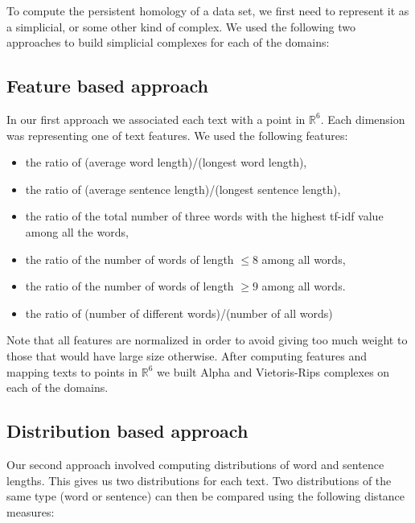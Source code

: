 \documentclass[12pt,a4paper]{amsart}
\def\R{\mathbb R}
\begin{document}
To compute the persistent homology of a data set, we first need to represent it
as a simplicial, or some other kind of complex. We used the following two
approaches to build simplicial complexes for each of the domains:

\subsection{Feature based approach}

In our first approach we associated each text with a point in $\R ^6$. Each
dimension was representing one of text features. We used the following features:
\begin{itemize}
  \setlength\itemsep{0.5em}
  \item the ratio of (average word length)/(longest word length),
  \item the ratio of (average sentence length)/(longest sentence length),
  \item the ratio of the total number of three words with the highest tf-idf
    value among all the words,
  \item the ratio of the number of words of length $\le 8$ among all words,
  \item the ratio of the number of words of length $\ge 9$ among all words.
  \item the ratio of (number of different words)/(number of all words)
\end{itemize}

Note that all features are normalized in order to avoid giving too much weight
to those that would have large size otherwise.
After computing features and mapping texts to points in $\R ^6$ we
built Alpha and Vietoris-Rips complexes on each of the domains.

\subsection{Distribution based approach}

Our second approach involved computing distributions of word and sentence
lengths. This gives us two distributions for each text. Two distributions of the
same type (word or sentence) can then be compared using the following distance
measures:
\end{document}
